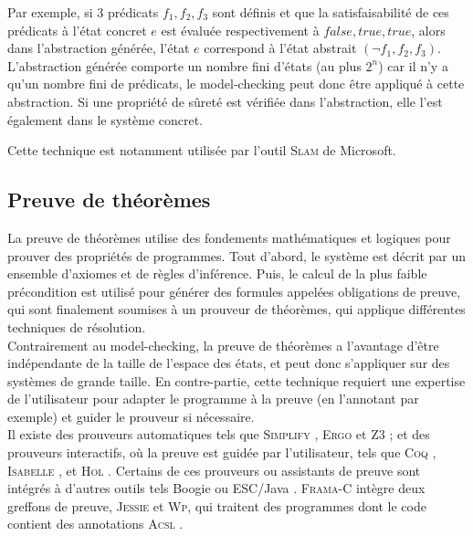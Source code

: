 Par exemple, si 3 prédicats $f_1, f_2, f_3$ sont définis et que la
satisfaisabilité de ces prédicats à l'état concret $e$ est évaluée
respectivement à $false, true, true$, alors dans l'abstraction générée, l'état
$e$ correspond à l'état abstrait $(\lnot f_1, f_2, f_3)$.\\

L'abstraction générée comporte un nombre fini d'états (au plus $2^n$) car il n'y
a qu'un nombre fini de prédicats, le model-checking peut donc être appliqué à
cette abstraction. Si une propriété de sûreté est vérifiée dans l'abstraction,
elle l'est également dans le système concret.

Cette technique est notamment utilisée par l'outil \textsc{Slam} \cite{SLAM} de
Microsoft.


\subsection{Preuve de théorèmes}
\label{sec:preuve}

La preuve de théorèmes utilise des fondements mathématiques et logiques
\cite{Hoare} pour prouver des propriétés de programmes. Tout d'abord, le système
est décrit par un ensemble d'axiomes et de règles d'inférence. Puis, le calcul
de la plus faible précondition \cite{Dijkstra} est utilisé pour générer des
formules appelées obligations de preuve, qui sont finalement soumises à un
prouveur de théorèmes, qui applique différentes techniques de résolution.\\

Contrairement au model-checking, la preuve de théorèmes a l'avantage d'être
indépendante de la taille de l'espace des états, et peut donc s'appliquer sur
des systèmes de grande taille. En contre-partie, cette technique requiert une
expertise de l'utilisateur pour adapter le programme à la preuve (en l'annotant
par exemple) et guider le prouveur si nécessaire.\\

Il existe des prouveurs automatiques tels que \textsc{Simplify}
\cite{Simplify}, \textsc{Ergo} \cite{Ergo} et \textsc{Z3} \cite{Z3}; et des
prouveurs interactifs, où la preuve est guidée par l'utilisateur, tels que
\textsc{Coq} \cite{Coq}, \textsc{Isabelle} \cite{Isabelle}, et \textsc{Hol}
\cite{HOL}. Certains de ces prouveurs ou assistants de preuve sont intégrés à
d'autres outils tels Boogie \cite{Boogie} ou ESC/Java \cite{ESC/Java}.
\textsc{Frama-C} intègre deux greffons de preuve, \textsc{Jessie} et
\textsc{Wp}, qui traitent des programmes dont le code contient des annotations
\textsc{Acsl} \cite{ACSL}.



